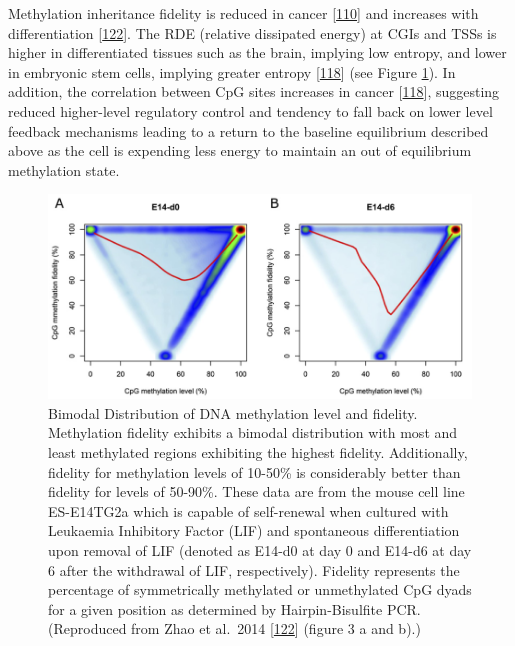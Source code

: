 \documentclass[
]{book}
\begin{document}
Methylation inheritance fidelity is reduced in cancer {[}\protect\hyperlink{ref-Ushijima2005}{110}{]} and increases with differentiation {[}\protect\hyperlink{ref-Zhao2014}{122}{]}.
The RDE (relative dissipated energy) at CGIs and TSSs is higher in differentiated tissues such as the brain, implying low entropy, and lower in embryonic stem cells, implying greater entropy {[}\protect\hyperlink{ref-Jenkinson2017}{118}{]} (see Figure \ref{fig:Zhao2014fig3ab}).
In addition, the correlation between CpG sites increases in cancer {[}\protect\hyperlink{ref-Jenkinson2017}{118}{]}, suggesting reduced higher-level regulatory control and tendency to fall back on lower level feedback mechanisms leading to a return to the baseline equilibrium described above as the cell is expending less energy to maintain an out of equilibrium methylation state.

\begin{figure}

{\centering \includegraphics[width=0.8\linewidth]{figs/Zhao2014-fig3-ab} 

}

\caption{Bimodal Distribution of DNA methylation level and fidelity. Methylation fidelity exhibits a bimodal distribution with most and least methylated regions exhibiting the highest fidelity. Additionally, fidelity for methylation levels of 10-50\% is considerably better than fidelity for levels of 50-90\%. These data are from the mouse cell line ES-E14TG2a which is capable of self-renewal when cultured with Leukaemia Inhibitory Factor (LIF) and spontaneous differentiation upon removal of LIF (denoted as E14-d0 at day 0 and E14-d6 at day 6 after the withdrawal of LIF, respectively). Fidelity represents the percentage of symmetrically methylated or unmethylated CpG dyads for a given position as determined by Hairpin-Bisulfite PCR. (Reproduced from Zhao et al.~2014 {[}\protect\hyperlink{ref-Zhao2014}{122}{]} (figure 3 a and b).)}\label{fig:Zhao2014fig3ab}
\end{figure}
\end{document}
